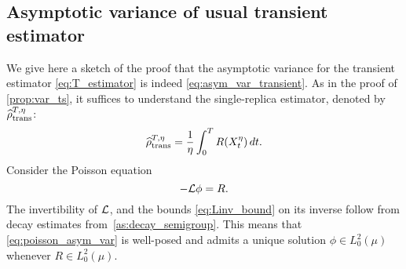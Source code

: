 \begin{appendices}
\section{Asymptotic variance of usual transient estimator}
\label{app:transient_var}
%
We give here a sketch of the proof that the asymptotic variance for the transient estimator \eqref{eq:T_estimator} is indeed \eqref{eq:asym_var_transient}. As in the proof of \cref{prop:var_ts}, it suffices to understand the single-replica estimator, denoted by $\widehat{\rho}^{T,\eta}_{\rm trans}$:
%
\begin{equation}
	\widehat{\rho}^{T,\eta}_{\rm trans} = \frac{1}{\eta}\int_0^T R(X_t^\eta) \, dt.
\end{equation}
%
Consider the Poisson equation%
%
\begin{equation}
	-\mathcal{L}\phi = R.
    \label{eq:poisson_asym_var}
\end{equation}
%
The invertibility of $\mathcal{L}$, and the bounds \eqref{eq:Linv_bound} on its inverse follow from decay estimates from~\cref{as:decay_semigroup}. This means that \eqref{eq:poisson_asym_var} is well-posed and admits a unique solution $\phi \in L^2_0(\mu)$ whenever $R\in L^2_0(\mu)$. 


\end{appendices}
